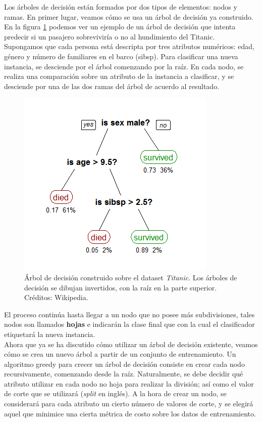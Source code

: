 Los árboles de decisión están formados por dos tipos de elementos: nodos y ramas. En primer lugar, veamos cómo se usa un árbol de decisión ya construido. En la figura \ref{fig:tree} podemos ver un ejemplo de un árbol de decisión que intenta predecir si un pasajero sobreviviría o no al hundimiento del Titanic.  \\

Supongamos que cada persona está descripta por tres atributos numéricos: edad, género y número de familiares en el barco (sibsp). Para clasificar una nueva instancia, se desciende por el árbol comenzando por la raíz. En cada nodo, se realiza una comparación sobre un atributo de la instancia a clasificar, y se desciende por una de las dos ramas del árbol de acuerdo al resultado. \\

\begin{figure}[h!]
\begin{center}
\includegraphics[width=.44\textwidth]{Kap1/tree.png}
\end{center}
\caption[short]{Árbol de decisión construido sobre el dataset \textit{Titanic}. Los árboles de decisión se dibujan invertidos, con la raíz en la parte superior. Créditos: Wikipedia. }
\label{fig:tree}
\end{figure}

El proceso continúa hasta llegar a un nodo que no posee más subdivisiones, tales nodos son llamados \textbf{hojas} e indicarán la clase final que con la cual el clasificador etiquetará la nueva instancia. \\

Ahora que ya se ha discutido cómo utilizar un árbol de decisión existente, veamos cómo se crea un nuevo árbol a partir de un conjunto de entrenamiento. Un algoritmo greedy para crecer un árbol de decisión consiste en crear cada nodo recursivamente, comenzando desde la raíz. Naturalmente, se debe decidir qué atributo utilizar en cada nodo no hoja para realizar la división; así como el valor de corte que se utilizará (\textit{split} en inglés). A la hora de crear un nodo, se considerará para cada atributo un cierto número de valores de corte, y se elegirá aquel que minimice una cierta métrica de costo sobre los datos de entrenamiento. \\

